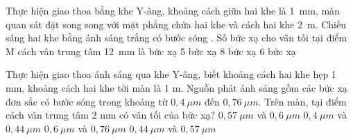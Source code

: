 \begin{vidu}%
Thực hiện giao thoa bằng khe Y-âng, khoảng cách giữa hai khe là 1\ mm, màn quan sát đặt song song  với mặt phẳng chứa hai khe và cách hai khe 2\ m. Chiếu sáng hai khe bằng ánh sáng trắng có bước sóng . Số bức xạ cho vân tối tại điểm M cách vân trung tâm 12\ mm là
\choice
{ bức xạ}
{5 bức xạ}
{8 bức xạ}
{6 bức xạ}
\end{vidu} 

\begin{vidu}%
Thực hiện giao thoa ánh sáng qua khe Y-âng, biết khoảng cách hai khe hẹp 1 mm, khoảng cách hai
khe tới màn là 1 m. Nguồn phát ánh sáng gồm các bức xạ đơn sắc có bước sóng trong khoảng từ $0,4\ \mu m $ đến $0,76\ \mu m $. Trên màn, tại điểm cách vân trung tâm 2 mm có vân tối của bức xạ?
\choice
{ $0,57\ \mu m $ và $0,6\ \mu m $}
{ $0,4\ \mu m $ và $0,44\ \mu m $}
{ $0,6\ \mu m $ và $0,76\ \mu m $}
{\True  $0,44\ \mu m $ và $0,57\ \mu m $}
\end{vidu} 

